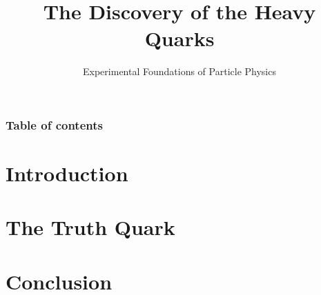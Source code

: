 \documentclass[9pt, xcolor=dvipsnames]{beamer}
\title[Heavy Quarks]{The Discovery of the Heavy Quarks}
\subtitle{Experimental Foundations of Particle Physics}
\begin{document}


\begin{frame}%
	\frametitle{Table of contents}
	\tableofcontents[hideallsubsections]   %
\end{frame}

\section{Introduction}


% 

\section{The Truth Quark}



\section{Conclusion}


\end{document}

